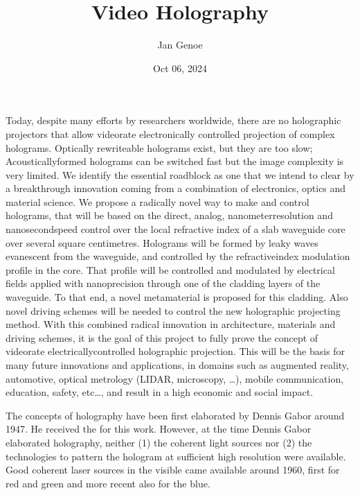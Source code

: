 \documentclass[a4paper,10pt,english,openany,oneside]{jupyterBook}
\title{Video Holography}
\date{Oct 06, 2024}
\author{Jan Genoe}
\begin{document}
\pagestyle{empty}
\sphinxmaketitle
\pagestyle{plain}
\sphinxtableofcontents
\pagestyle{normal}
\label{\detokenize{intro2::doc}}


\begin{DUlineblock}{0em}
\item[] 
\end{DUlineblock}

\sphinxAtStartPar
Today, despite many efforts by researchers world\sphinxhyphen{}wide, there are no holographic projectors that allow video\sphinxhyphen{}rate electronically controlled projection of complex holograms. Optically re\sphinxhyphen{}write\sphinxhyphen{}able holograms exist, but they are too slow; Acoustically\sphinxhyphen{}formed holograms can be switched fast but the image complexity is very limited. We identify the essential roadblock as one that we intend to clear by a breakthrough innovation coming from a combination of electronics, optics and material science.
We propose a radically novel way to make and control holograms, that will be based on the direct, analog, nanometer\sphinxhyphen{}resolution and nanosecond\sphinxhyphen{}speed control over the local refractive index of a slab waveguide core over several square centimetres. Holograms will be formed by leaky waves evanescent from the waveguide, and controlled by the refractive\sphinxhyphen{}index modulation profile in the core. That profile will be controlled and modulated by electrical fields applied with nano\sphinxhyphen{}precision through one of the cladding layers of the waveguide. To that end, a novel metamaterial is proposed for this cladding. Also novel driving schemes will be needed to control the new holographic projecting method.
With this combined radical innovation in architecture, materials and driving schemes, it is the goal of this project to fully prove the concept of video\sphinxhyphen{}rate electrically\sphinxhyphen{}controlled holographic projection. This will be the basis for many future innovations and applications, in domains such as augmented reality, automotive, optical metrology (LIDAR, microscopy, …), mobile communication, education, safety, etc…, and result in a high economic and social impact.

\begin{DUlineblock}{0em}
\item[] 
\end{DUlineblock}

\sphinxAtStartPar
The concepts of holography have been first elaborated by Dennis Gabor around 1947. He received the  for this work. However, at the time Dennis Gabor elaborated holography, neither (1) the coherent light sources nor (2) the technologies to pattern the hologram at sufficient high resolution were available. Good coherent laser sources in the visible came available around 1960, first for red and green and more recent also for the blue.
\end{document}
